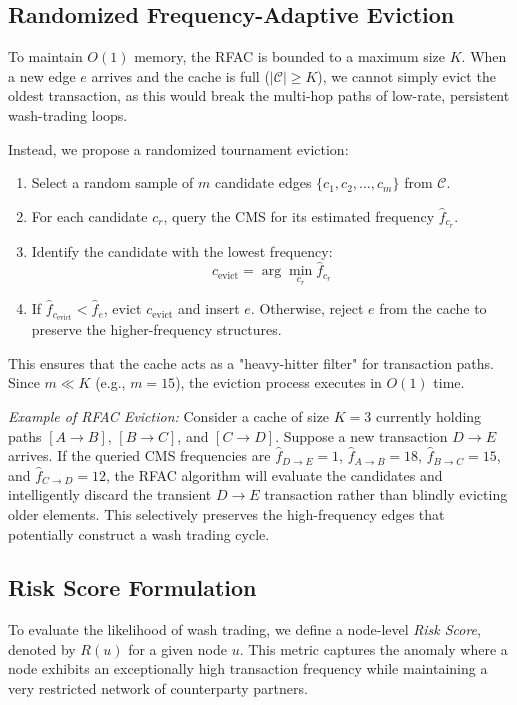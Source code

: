 \documentclass[conference]{IEEEtran}
\begin{document}
\subsection{Randomized Frequency-Adaptive Eviction}
To maintain $O(1)$ memory, the RFAC is bounded to a maximum size $K$. When a new edge $e$ arrives and the cache is full ($|\mathcal{C}| \ge K$), we cannot simply evict the oldest transaction, as this would break the multi-hop paths of low-rate, persistent wash-trading loops. 

Instead, we propose a randomized tournament eviction:
\begin{enumerate}
    \item Select a random sample of $m$ candidate edges $\{c_1, c_2, \dots, c_m\}$ from $\mathcal{C}$.
    \item For each candidate $c_r$, query the CMS for its estimated frequency $\hat{f}_{c_r}$.
    \item Identify the candidate with the lowest frequency:
    \begin{equation}
    c_{\text{evict}} = \arg\min_{c_r} \hat{f}_{c_r}
    \end{equation}
    \item If $\hat{f}_{c_{\text{evict}}} < \hat{f}_e$, evict $c_{\text{evict}}$ and insert $e$. Otherwise, reject $e$ from the cache to preserve the higher-frequency structures.
\end{enumerate}
This ensures that the cache acts as a "heavy-hitter filter" for transaction paths. Since $m \ll K$ (e.g., $m = 15$), the eviction process executes in $O(1)$ time.

\textit{Example of RFAC Eviction:} Consider a cache of size $K=3$ currently holding paths $[A \to B]$, $[B \to C]$, and $[C \to D]$. Suppose a new transaction $D \to E$ arrives. If the queried CMS frequencies are $\hat{f}_{D \to E} = 1$, $\hat{f}_{A \to B} = 18$, $\hat{f}_{B \to C} = 15$, and $\hat{f}_{C \to D} = 12$, the RFAC algorithm will evaluate the candidates and intelligently discard the transient $D \to E$ transaction rather than blindly evicting older elements. This selectively preserves the high-frequency edges that potentially construct a wash trading cycle.

\subsection{Risk Score Formulation}
To evaluate the likelihood of wash trading, we define a node-level \textit{Risk Score}, denoted by $R(u)$ for a given node $u$. This metric captures the anomaly where a node exhibits an exceptionally high transaction frequency while maintaining a very restricted network of counterparty partners. 
\end{document}
